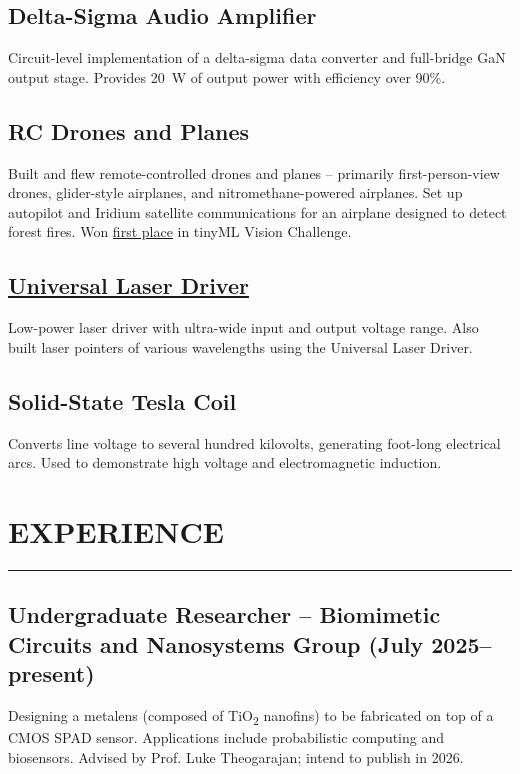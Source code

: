 	\subsection{Delta-Sigma Audio Amplifier}
	Circuit-level implementation of a delta-sigma data converter and full-bridge GaN output stage. Provides \qty{20}{\watt} of output power with efficiency over 90\%.
	\subsection{RC Drones and Planes}
	Built and flew remote-controlled drones and planes -- primarily first-person-view drones, glider-style airplanes, and nitromethane-powered airplanes. Set up autopilot and Iridium satellite communications for an airplane designed to detect forest fires. Won \href{https://www.hackster.io/team-sol/tinyml-aerial-forest-fire-detection-78ec6b}{first place} in tinyML Vision Challenge.
	\subsection{\href{https://github.com/SAR-mango/Universal-Laser-Driver}{Universal Laser Driver}}
	Low-power laser driver with ultra-wide input and output voltage range. Also built laser pointers of various wavelengths using the Universal Laser Driver.
	\subsection{Solid-State Tesla Coil}
	Converts line voltage to several hundred kilovolts, generating foot-long electrical arcs. Used to demonstrate high voltage and electromagnetic induction.
	\section*{EXPERIENCE}
	\hrule\smallskip
	\subsection{Undergraduate Researcher -- Biomimetic Circuits and Nanosystems Group (July 2025--present)}
		Designing a metalens (composed of TiO\textsubscript{2} nanofins) to be fabricated on top of a CMOS SPAD sensor. Applications include probabilistic computing and biosensors. Advised by Prof. Luke Theogarajan; intend to publish in 2026.
